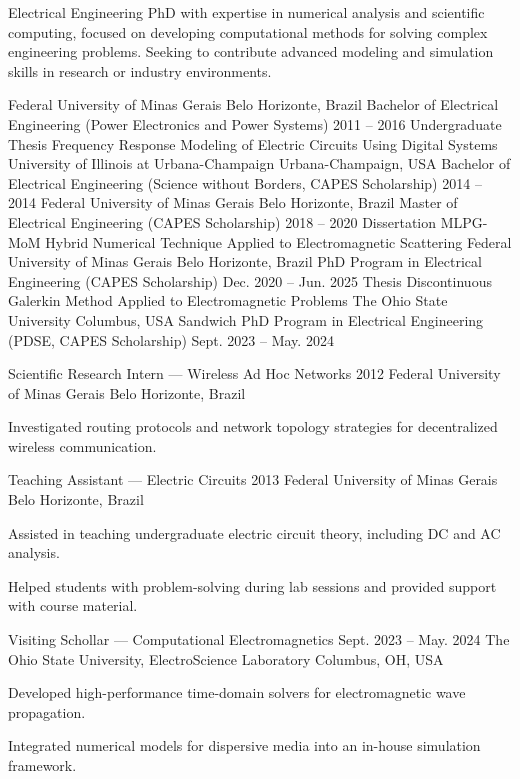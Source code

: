 \documentclass{cv}
\begin{document}
\makeprofileheader

\begin{Objective}
    Electrical Engineering PhD with expertise in numerical analysis
    and scientific computing, focused on developing computational
    methods for solving complex engineering problems. Seeking to
    contribute advanced modeling and simulation skills in research or
    industry environments.
\end{Objective}

\begin{Education}
    \educationitem
    {Federal University of Minas Gerais}
    {Belo Horizonte, Brazil}
    {Bachelor of Electrical Engineering (Power Electronics and Power Systems)}
    {2011 -- 2016}
    {Undergraduate Thesis}
    {Frequency Response Modeling of Electric Circuits Using Digital Systems}
    \educationitem
    {University of Illinois at Urbana-Champaign}
    {Urbana-Champaign, USA}
    {Bachelor of Electrical Engineering (Science without Borders,
    CAPES Scholarship)}
    {2014 -- 2014}
    {}
    {}
    \educationitem
    {Federal University of Minas Gerais}
    {Belo Horizonte, Brazil}
    {Master of Electrical Engineering (CAPES Scholarship)}
    {2018 -- 2020}
    {Dissertation}
    {MLPG-MoM Hybrid Numerical Technique Applied to Electromagnetic Scattering}
    \educationitem
    {Federal University of Minas Gerais}
    {Belo Horizonte, Brazil}
    {PhD Program in Electrical Engineering (CAPES Scholarship)}
    {Dec. 2020 -- Jun. 2025}
    {Thesis}
    {Discontinuous Galerkin Method Applied to Electromagnetic Problems}
    \educationitem
    {The Ohio State University}
    {Columbus, USA}
    {Sandwich PhD Program in Electrical Engineering (PDSE, CAPES Scholarship)}
    {Sept. 2023 -- May. 2024}
    {}
    {}
\end{Education}

\begin{Experience}
    \experienceitem
    {Scientific Research Intern — Wireless Ad Hoc Networks}
    {2012}
    {Federal University of Minas Gerais}
    {Belo Horizonte, Brazil}
    {
    \item Investigated routing protocols and network topology
        strategies for decentralized wireless communication.
    }
    \experienceitem
    {Teaching Assistant — Electric Circuits}
    {2013}
    {Federal University of Minas Gerais}
    {Belo Horizonte, Brazil}
    {
    \item Assisted in teaching undergraduate electric circuit theory,
        including DC and AC analysis.
    \item Helped students with problem-solving during lab sessions
        and provided support with course material.
    }
    \experienceitem
    {Visiting Schollar — Computational Electromagnetics}
    {Sept. 2023 -- May. 2024}
    {The Ohio State University, ElectroScience Laboratory}
    {Columbus, OH, USA}
    {
    \item Developed high-performance time-domain solvers for
        electromagnetic wave propagation.
    \item Integrated numerical models for dispersive media into an
        in-house simulation framework.
    }
\end{Experience}
\end{document}
